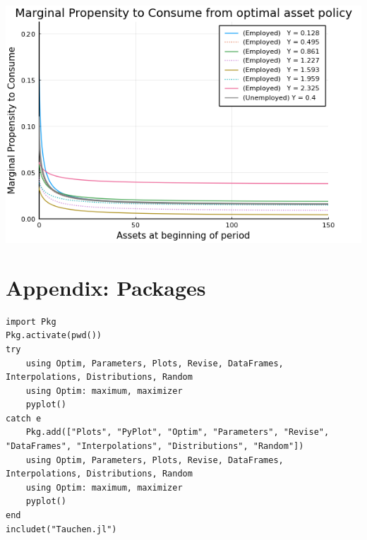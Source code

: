 \documentclass[12pt]{article}
\begin{document}
\includegraphics[]{problem sets/ps9/N-mpc.png}















\newpage
\section*{Appendix: Packages}
\begin{lstlisting}[language=JuliaLocal, style=julia]
import Pkg
Pkg.activate(pwd())
try
    using Optim, Parameters, Plots, Revise, DataFrames, Interpolations, Distributions, Random
    using Optim: maximum, maximizer
    pyplot()
catch e
    Pkg.add(["Plots", "PyPlot", "Optim", "Parameters", "Revise", "DataFrames", "Interpolations", "Distributions", "Random"])
    using Optim, Parameters, Plots, Revise, DataFrames, Interpolations, Distributions, Random
    using Optim: maximum, maximizer
    pyplot()
end
includet("Tauchen.jl")
\end{lstlisting}












\newpage
\end{document}
